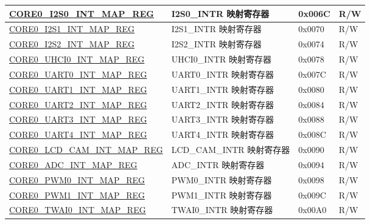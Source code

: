 \begin{longtable}{ | p{8.7cm} | p{6.2cm} | p{1.3cm} | p{1cm} | }
\hyperref[regdesc:CORE0I2S0INTMAPREG]{CORE0\_I2S0\_INT\_MAP\_REG} & I2S0\_INTR 映射寄存器 & 0x006C & R/W \\ \hline

\hyperref[regdesc:CORE0I2S1INTMAPREG]{CORE0\_I2S1\_INT\_MAP\_REG} & I2S1\_INTR 映射寄存器 & 0x0070 & R/W \\ \hline

\hyperref[regdesc:CORE0I2S2INTMAPREG]{CORE0\_I2S2\_INT\_MAP\_REG} & I2S2\_INTR 映射寄存器 & 0x0074 & R/W \\ \hline

\hyperref[regdesc:CORE0UHCI0INTMAPREG]{CORE0\_UHCI0\_INT\_MAP\_REG} & UHCI0\_INTR 映射寄存器 & 0x0078 & R/W \\ \hline

\hyperref[regdesc:CORE0UART0INTMAPREG]{CORE0\_UART0\_INT\_MAP\_REG} & UART0\_INTR 映射寄存器 & 0x007C & R/W \\ \hline

\hyperref[regdesc:CORE0UART1INTMAPREG]{CORE0\_UART1\_INT\_MAP\_REG} & UART1\_INTR 映射寄存器 & 0x0080 & R/W \\ \hline

\hyperref[regdesc:CORE0UART2INTMAPREG]{CORE0\_UART2\_INT\_MAP\_REG} & UART2\_INTR 映射寄存器 & 0x0084 & R/W \\ \hline

\hyperref[regdesc:CORE0UART3INTMAPREG]{CORE0\_UART3\_INT\_MAP\_REG} & UART3\_INTR 映射寄存器 & 0x0088 & R/W \\ \hline

\hyperref[regdesc:CORE0UART4INTMAPREG]{CORE0\_UART4\_INT\_MAP\_REG} & UART4\_INTR 映射寄存器 & 0x008C & R/W \\ \hline

\hyperref[regdesc:CORE0LCDCAMINTMAPREG]{CORE0\_LCD\_CAM\_INT\_MAP\_REG} & LCD\_CAM\_INTR 映射寄存器 & 0x0090 & R/W \\ \hline

\hyperref[regdesc:CORE0ADCINTMAPREG]{CORE0\_ADC\_INT\_MAP\_REG} & ADC\_INTR 映射寄存器 & 0x0094 & R/W \\ \hline

\hyperref[regdesc:CORE0PWM0INTMAPREG]{CORE0\_PWM0\_INT\_MAP\_REG} & PWM0\_INTR 映射寄存器 & 0x0098 & R/W \\ \hline

\hyperref[regdesc:CORE0PWM1INTMAPREG]{CORE0\_PWM1\_INT\_MAP\_REG} & PWM1\_INTR 映射寄存器 & 0x009C & R/W \\ \hline

\hyperref[regdesc:CORE0TWAI0INTMAPREG]{CORE0\_TWAI0\_INT\_MAP\_REG} & TWAI0\_INTR 映射寄存器 & 0x00A0 & R/W \\ \hline


\end{longtable}
